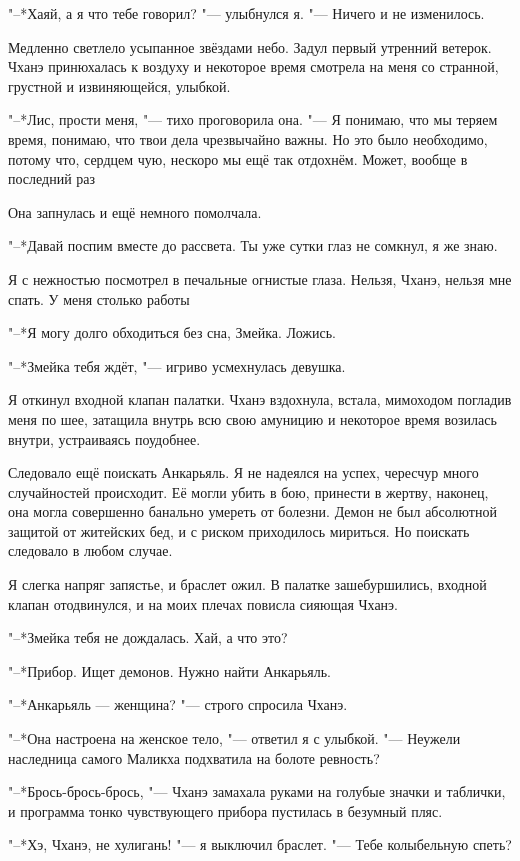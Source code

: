 "--*Хаяй, а я что тебе говорил? "--- улыбнулся я.
"--- Ничего и не изменилось.

Медленно светлело усыпанное звёздами небо.
Задул первый утренний ветерок.
Чханэ принюхалась к воздуху и некоторое время смотрела на меня со странной, грустной и извиняющейся, улыбкой.

"--*Лис, прости меня, "--- тихо проговорила она.
"--- Я понимаю, что мы теряем время, понимаю, что твои дела чрезвычайно важны.
Но это было необходимо, потому что, сердцем чую, нескоро мы ещё так отдохнём.
Может, вообще в последний раз\ldotst

Она запнулась и ещё немного помолчала.

"--*Давай поспим вместе до рассвета.
Ты уже сутки глаз не сомкнул, я же знаю.

Я с нежностью посмотрел в печальные огнистые глаза.
Нельзя, Чханэ, нельзя мне спать.
У меня столько работы\ldotst

"--*Я могу долго обходиться без сна, Змейка.
Ложись.

"--*Змейка тебя ждёт, "--- игриво усмехнулась девушка.

Я откинул входной клапан палатки.
Чханэ вздохнула, встала, мимоходом погладив меня по шее, затащила внутрь всю свою амуницию и некоторое время возилась внутри, устраиваясь поудобнее.

Следовало ещё поискать Анкарьяль.
Я не надеялся на успех, чересчур много случайностей происходит.
Её могли убить в бою, принести в жертву, наконец, она могла совершенно банально умереть от болезни.
Демон не был абсолютной защитой от житейских бед, и с риском приходилось мириться.
Но поискать следовало в любом случае.

Я слегка напряг запястье, и браслет ожил.
В палатке зашебуршились, входной клапан отодвинулся, и на моих плечах повисла сияющая Чханэ.

"--*Змейка тебя не дождалась.
Хай, а что это?

"--*Прибор.
Ищет демонов.
Нужно найти Анкарьяль.

"--*Анкарьяль — женщина? "--- строго спросила Чханэ.

"--*Она настроена на женское тело, "--- ответил я с улыбкой.
"--- Неужели наследница самого Маликха подхватила на болоте ревность?

"--*Брось-брось-брось, "--- Чханэ замахала руками на голубые значки и таблички, и программа тонко чувствующего прибора пустилась в безумный пляс.

"--*Хэ, Чханэ, не хулигань! "--- я выключил браслет.
"--- Тебе колыбельную спеть?

